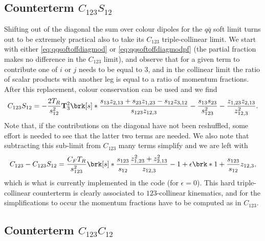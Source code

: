 \documentclass[11pt,a4paper]{article}
\newcommand{\eps}[0]{\epsilon}
\newcommand{\colorT}[1]{\mathbf{T}_{#1}}
\begin{document}
\subsection{Counterterm $C_{123}S_{12}$}

Shifting out of the diagonal the sum over colour dipoles for the $q\bar{q}$ soft limit
turns out to be extremely practical also to take its $C_{123}$ triple-collinear limit.
We start with either \cref{eq:qqsoftoffdiagmod} or \cref{eq:qqsoftoffdiagmodpf}
(the partial fraction makes no difference in the $C_{123}$ limit), and observe that
for a given term to contribute one of $i$ or $j$ needs to be equal to $3$,
and in the collinear limit the ratio of scalar products with another leg
is equal to a ratio of momentum fractions.
After this replacement, colour conservation can be used and we find
\begin{equation}
	C_{123}S_{12} = - \frac{2T_R}{s_{12}^2} \colorT{3}^2
	\brk[s]*{
		\frac{s_{13} z_{2,13} + s_{23} z_{1,23} - s_{12} z_{3,12}}
		{s_{123} z_{12,3}}
		- \frac{s_{13}s_{23}}{s_{123}^2} - \frac{z_{1,23} z_{2,13}}{z_{12,3}^2}
	}.
\end{equation}
Note that, if the contributions on the diagonal have not been reshuffled,
some effort is needed to see that the latter two terms are needed.
We also note that subtracting this sub-limit from $C_{123}$
many terms simplify and we are left with
\begin{equation}
	C_{123} - C_{123}S_{12} = \frac{C_F T_R}{s_{123}^2} \brk[s]*{
		\frac{s_{123}}{s_{12}} \frac{z_{1,23}^2 + z_{2,13}^2}{z_{12,3}} - 1
		+ \eps \brk*{1 + \frac{s_{123}}{s_{12}} z_{12,3} }
	},
\end{equation}
which is what is currently implemented in the code (for $\eps=0$).
This hard triple-collinear counterterm is clearly associated
to $123$-collinear kinematics, and for the simplifications to occur
the momentum fractions have to be computed as in $C_{123}$.


\subsection{Counterterm $C_{123}C_{12}$}
\end{document}
